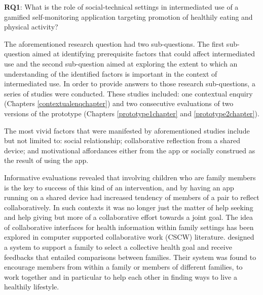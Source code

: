 \textbf{RQ1}: What is the role of social-technical settings in intermediated use of a gamified self-monitoring application targeting promotion of healthily eating and physical activity? 

The aforementioned research question had two sub-questions. The first sub-question aimed at identifying prerequisite factors that could affect intermediated use and the second sub-question aimed at exploring the extent to which an understanding of the identified factors is important in the context of intermediated use. In order to provide answers to those research sub-questions, a series of studies were conducted. These studies included: one contextual enquiry (Chapters \ref{contextualenqchapter}) and two consecutive evaluations of two versions of the prototype (Chapters \ref{prototype1chapter} and \ref{prototype2chapter}). 

The most vivid factors that were manifested by aforementioned studies include but not limited to: social relationship; collaborative reflection from a shared device; and motivational affordances  either from the app or socially construed as the result of using the app. 

Informative evaluations revealed that involving children who are family members is the key to success of this kind of an intervention, and by having an app running on a shared device had increased tendency of members of a pair to reflect collaboratively. In such contexts it was no longer just the matter of help seeking and help giving but more of a collaborative effort towards a joint goal. The idea of collaborative interfaces for health information within family settings has been explored in computer supported collaborative work (CSCW) literature. \cite{colineau2011motivating} designed a system to support a family to select a collective health goal and receive feedbacks that entailed comparisons between families. Their system was found to encourage members from within a family or members of different families, to work together and in particular to help each other in finding ways to live a healthily lifestyle. 

